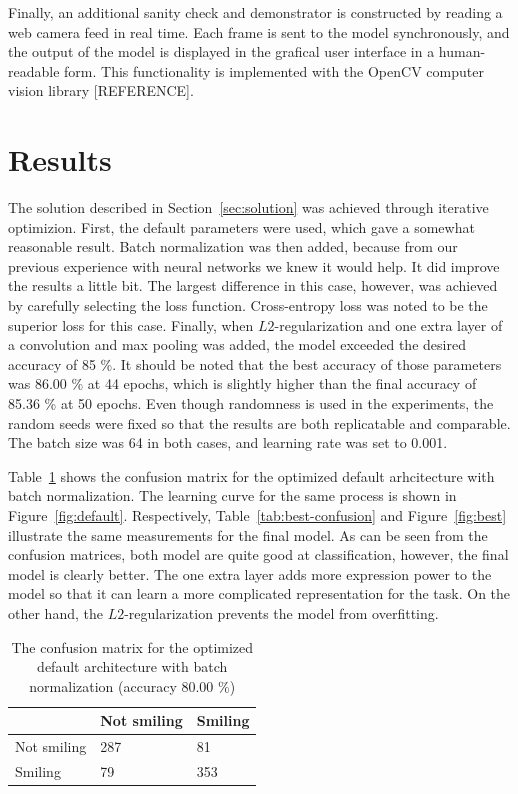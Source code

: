 \documentclass{article}
\begin{document}
Finally, an additional sanity check and demonstrator is constructed by
reading a web camera feed in real time. Each frame is sent to the
model synchronously, and the output of the model is displayed in the
grafical user interface in a human-readable form. This functionality
is implemented with the OpenCV computer vision library [REFERENCE].

\section{Results}\label{sec:results}
The solution described in Section~\ref{sec:solution} was achieved
through iterative optimizion. First, the default parameters were used,
which gave a somewhat reasonable result. Batch normalization was then
added, because from our previous experience with neural networks we
knew it would help. It did improve the results a little bit. The
largest difference in this case, however, was achieved by carefully
selecting the loss function. Cross-entropy loss was noted to be the
superior loss for this case. Finally, when $L2$-regularization and one
extra layer of a convolution and max pooling was added, the model
exceeded the desired accuracy of 85 \%. It should be noted that the
best accuracy of those parameters was 86.00 \% at 44 epochs, which is
slightly higher than the final accuracy of 85.36 \% at 50 epochs. Even
though randomness is used in the experiments, the random seeds were
fixed so that the results are both replicatable and comparable. The
batch size was 64 in both cases, and learning rate was set to 0.001.

Table~\ref{tab:default-confusion} shows the confusion matrix for the
optimized default arhcitecture with batch normalization. The learning
curve for the same process is shown in Figure~\ref{fig:default}.
Respectively, Table~\ref{tab:best-confusion} and Figure~\ref{fig:best}
illustrate the same measurements for the final model. As can be seen
from the confusion matrices, both model are quite good at
classification, however, the final model is clearly better. The one
extra layer adds more expression power to the model so that it can
learn a more complicated representation for the task. On the other
hand, the $L2$-regularization prevents the model from overfitting.

\begin{table}[]
\centering
\caption{The confusion matrix for the optimized default architecture
  with batch normalization (accuracy 80.00 \%)}\label{tab:default-confusion}
\begin{tabular}{lll}
\hline
                                 & Not smiling & Smiling \\ \hline
\multicolumn{1}{l|}{Not smiling} & 287         & 81      \\
\multicolumn{1}{l|}{Smiling}     & 79          & 353     \\ \hline
\end{tabular}
\end{table}
\end{document}
